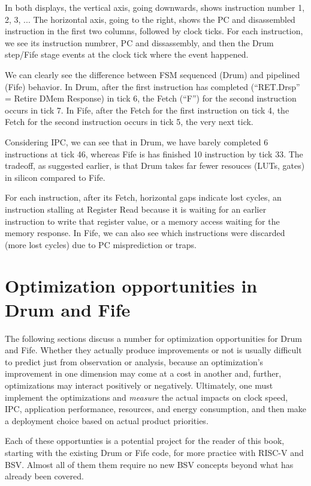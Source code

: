 In both displays, the vertical axis, going downwards, shows
instruction number 1, 2, 3, ...  The horizontal axis, going to the
right, shows the PC and disassembled instruction in the first two
columns, followed by clock ticks.  For each instruction, we see its
instruction numbrer, PC and dissassembly, and then the Drum step/Fife
stage events at the clock tick where the event happened.

We can clearly see the difference between FSM sequenced (Drum) and
pipelined (Fife) behavior.  In Drum, after the first instruction has
completed (``RET.Drsp'' = Retire DMem Response) in tick 6, the Fetch
(``F'') for the second instruction occurs in tick 7.  In Fife, after
the Fetch for the first instruction on tick 4, the Fetch for the
second instruction occurs in tick 5, the very next tick.

Considering IPC, we can see that in Drum, we have barely completed 6
instructions at tick 46, whereas Fife is has finished 10 instruction
by tick 33.  The tradeoff, as suggested earlier, is that Drum takes
far fewer resouces (LUTs, gates) in silicon compared to Fife.

For each instruction, after its Fetch, horizontal gaps indicate lost
cycles, {\eg} an instruction stalling at Register Read because it is
waiting for an earlier instruction to write that register value, or a
memory access waiting for the memory response.  In Fife, we can also
see which instructions were discarded (more lost cycles) due to PC
misprediction or traps.


\section{Optimization opportunities in Drum and Fife}

The following sections discuss a number for optimization opportunities
for Drum and Fife.  Whether they actually produce improvements or not
is usually difficult to predict just from observation or analysis,
because an optimization's improvement in one dimension may come at a
cost in another and, further, optimizations may interact positively or
negatively.  Ultimately, one must implement the optimizations and
\emph{measure} the actual impacts on clock speed, IPC, application
performance, resources, and energy consumption, {\etc} and then make a
deployment choice based on actual product priorities.

Each of these opportunties is a potential project for the reader of
this book, starting with the existing Drum or Fife code, for more
practice with RISC-V and BSV.  Almost all of them them require no new
BSV concepts beyond what has already been covered.


